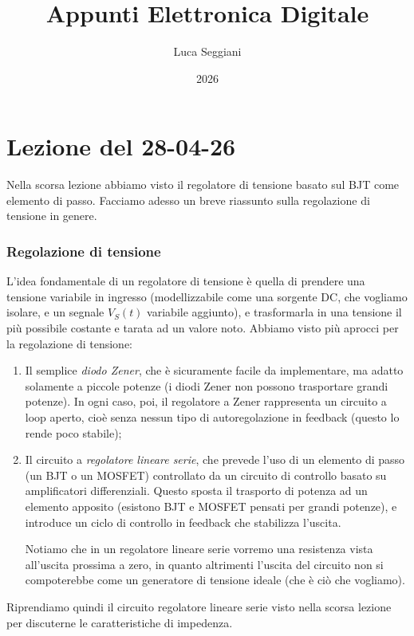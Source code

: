 \documentclass[a4paper,11pt]{article}
\title{Appunti Elettronica Digitale}
\author{Luca Seggiani}
\date{2026}
\begin{document}
\section{Lezione del 28-04-26}

\thispagestyle{empty}
\pagestyle{fancy}

Nella scorsa lezione abbiamo visto il regolatore di tensione basato sul BJT come elemento di passo. Facciamo adesso un breve riassunto sulla regolazione di tensione in genere.

\subsubsection{Regolazione di tensione}
L'idea fondamentale di un regolatore di tensione è quella di prendere una tensione variabile in ingresso (modellizzabile come una sorgente DC, che vogliamo isolare, e un segnale $V_S(t)$ variabile aggiunto), e trasformarla in una tensione il più possibile costante e tarata ad un valore noto. Abbiamo visto più aprocci per la regolazione di tensione:
\begin{enumerate}
\item Il semplice \textit{diodo Zener}, che è sicuramente facile da implementare, ma adatto solamente a piccole potenze (i diodi Zener non possono trasportare grandi potenze). In ogni caso, poi, il regolatore a Zener rappresenta un circuito a loop aperto, cioè senza nessun tipo di autoregolazione in feedback (questo lo rende poco stabile);
\item Il circuito a \textit{regolatore lineare serie}, che prevede l'uso di un elemento di passo (un BJT o un MOSFET) controllato da un circuito di controllo basato su amplificatori differenziali. Questo sposta il trasporto di potenza ad un elemento apposito (esistono BJT e MOSFET pensati per grandi potenze), e introduce un ciclo di controllo in feedback che stabilizza l'uscita.

Notiamo che in un regolatore lineare serie vorremo una resistenza vista all'uscita prossima a zero, in quanto altrimenti l'uscita del circuito non si compoterebbe come un generatore di tensione ideale (che è ciò che vogliamo).
\end{enumerate}

\par\smallskip

Riprendiamo quindi il circuito regolatore lineare serie visto nella scorsa lezione per discuterne le caratteristiche di impedenza.
\end{document}
